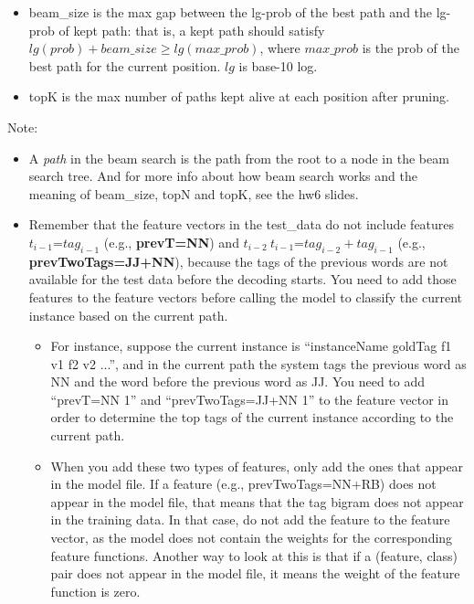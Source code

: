 \documentclass[11pt]{article}
\begin{document}
\begin{itemize}
  \item beam\_size is the max gap between the lg-prob of the best path
        and the lg-prob of kept path: 
        that is, a kept path should satisfy
        $lg(prob) + beam\_size \ge lg(max\_prob)$, where $max\_prob$ is 
        the prob of the best path for the current position.
        $lg$ is base-10 log.
        
  \item topK is the max number of paths kept alive
         at each position after pruning. 

\end{itemize}


Note:
 \begin{itemize}
   \item A {\it path} in the beam search is the path from the root
         to a node in the beam search tree.
         And for more info about how beam search works and the meaning of 
         beam\_size, topN and topK, see the hw6 slides.

   
   \item Remember that the feature vectors in the test\_data do not 
          include features $t_{i-1}$=$tag_{i-1}$ (e.g., {\bf prevT=NN})
          and $t_{i-2} \ t_{i-1}$=$tag_{i-2}+tag_{i-1}$ 
          (e.g., {\bf prevTwoTags=JJ+NN}), because the tags of the previous
          words are not available for the test data before the decoding 
          starts. You need to 
          add those features to the feature vectors before 
          calling the model to classify the current instance based on 
          the current path. 

     \begin{itemize}
      \item   For instance, suppose the current instance is ``instanceName goldTag
          f1 v1 f2 v2 ...'', and in the current path
          the system tags the previous word as NN
          and the word before the previous word as JJ. You need to 
          add ``prevT=NN 1'' and ``prevTwoTags=JJ+NN 1'' to the feature vector
          in order to determine the top tags of the current instance
          according to the current path.
          
       \item When you add these two types of features, only add the ones 
        that appear in the model file. If a feature (e.g., prevTwoTags=NN+RB)
        does not appear in the model file, that means that the tag bigram
        does not appear in the training data. In that case, do not add
        the feature to the feature vector, as the model does not contain
        the weights for the corresponding feature functions. Another way
        to look at this is that if a (feature, class) pair does not appear
        in the model file, it means the weight of the feature function
        is zero.


\end{itemize}
\end{itemize}
\end{document}
